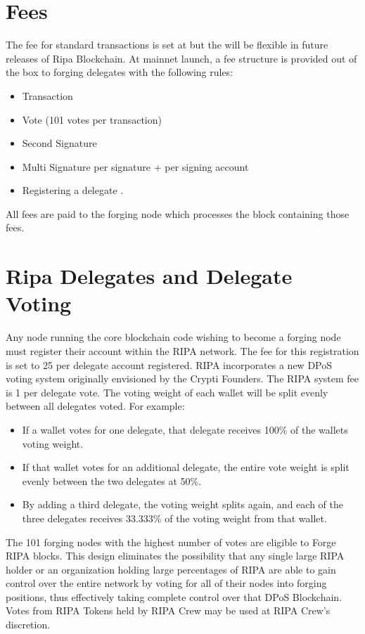 \documentclass[11pt,fleqn,oneside]{book} %
\begin{document}
\section{Fees}
The fee for standard transactions is set at  but the will be flexible in future releases of Ripa Blockchain.
At mainnet launch, a fee structure is provided out of the box to forging delegates with the following rules:
	\begin{itemize}
		\item Transaction 
		\item Vote  (101 votes per transaction)
		\item Second Signature 
		\item Multi Signature  per signature +  per signing account
		\item Registering a delegate .
	\end{itemize}
All fees are paid to the forging node which processes the block containing those fees.

\section{Ripa Delegates and Delegate Voting}
Any node running the core blockchain code wishing to become a forging node must
register their account within the RIPA network. The fee for this registration is set to
25 \PHP per delegate account registered.
RIPA incorporates a new DPoS voting system originally envisioned by the Crypti
Founders. The RIPA system fee is 1 \PHP per delegate vote. The voting weight of each
wallet will be split evenly between all delegates voted. For example:
\begin{itemize}
	\item If a wallet votes for one delegate, that delegate receives 100\% of the wallets
voting weight.
	\item If that wallet votes for an additional delegate, the entire vote weight is split
evenly between the two delegates at 50\%.
	\item By adding a third delegate, the voting weight splits again, and each of the
three delegates receives 33.333\% of the voting weight from that wallet.
\end{itemize}

The 101 forging nodes with the highest number of votes are eligible to Forge RIPA
blocks. This design eliminates the possibility that any single large RIPA holder or an
organization holding large percentages of RIPA are able to gain control over the
entire network by voting for all of their nodes into forging positions, thus effectively
taking complete control over that DPoS Blockchain. Votes from RIPA Tokens held by
RIPA Crew may be used at RIPA Crew's discretion.
\end{document}
